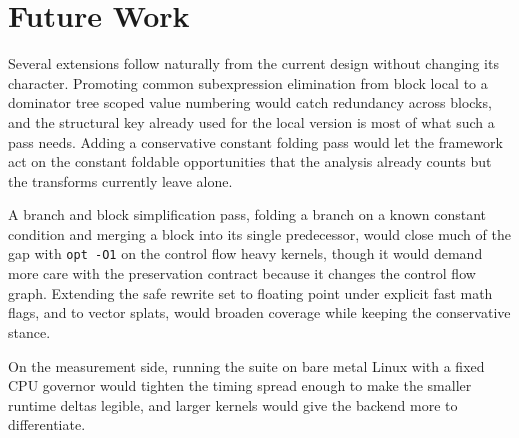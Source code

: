 \section{Future Work}

Several extensions follow naturally from the current design without changing its
character. Promoting common subexpression elimination from block local to a
dominator tree scoped value numbering would catch redundancy across blocks, and
the structural key already used for the local version is most of what such a pass
needs. Adding a conservative constant folding pass would let the framework act on
the constant foldable opportunities that the analysis already counts but the
transforms currently leave alone.

A branch and block simplification pass, folding a branch on a known constant
condition and merging a block into its single predecessor, would close much of
the gap with \texttt{opt -O1} on the control flow heavy kernels, though it would
demand more care with the preservation contract because it changes the control
flow graph. Extending the safe rewrite set to floating point under explicit fast
math flags, and to vector splats, would broaden coverage while keeping the
conservative stance.

On the measurement side, running the suite on bare metal Linux with a fixed CPU
governor would tighten the timing spread enough to make the smaller runtime
deltas legible, and larger kernels would give the backend more to differentiate.
